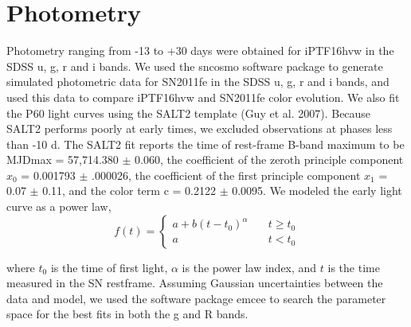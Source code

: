 \documentclass[twoside,twocolumn]{article}
\begin{document}
\section{Photometry}
Photometry ranging from -13 to +30 days were obtained for iPTF16hvw in the SDSS u, g, r and i bands. We used the sncosmo software package to generate simulated photometric data for SN2011fe in the SDSS u, g, r and i bands, and used this data to compare iPTF16hvw and SN2011fe color evolution. We also fit the P60 light curves using the SALT2 template (Guy et al. 2007). Because SALT2 performs poorly at early times, we excluded observations at phases less than -10 d. The SALT2 fit reports the time of rest-frame B-band maximum to be MJDmax = 57,714.380 $\pm$ 0.060, the coefficient of the zeroth principle component $x_{0}$ = 0.001793 $\pm$ .000026, the coefficient of the first principle component $x_{1}$ = 0.07 $\pm$ 0.11, and the color term c = 0.2122 $\pm$  0.0095.
We modeled the early light curve as a power law,
\begin{equation}
f(t) = \left\{
        \begin{array}{ll}
            a+ b(t - t_{0})^{\alpha}& \quad t  \geq t_{0} \\
            a & \quad t < t_{0}
        \end{array}
    \right.
\end{equation}

where $t_{0}$ is the time of first light, $\alpha$ is the power law index, and $t$ is the time measured in the SN restframe. Assuming Gaussian uncertainties between the data and model, we used the software package emcee to search the parameter space for the best fits in both the g and R bands.  
\end{document}
